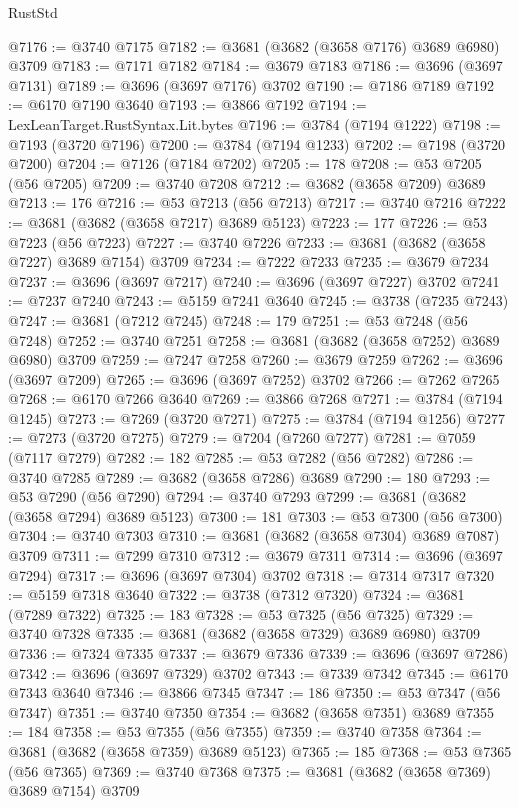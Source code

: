 \begin{lexlean}{RustStd}
\begin{coremodule}
@7176 := @3740 @7175
@7182 := @3681 (@3682 (@3658 @7176) @3689 @6980) @3709
@7183 := @7171 @7182
@7184 := @3679 @7183
@7186 := @3696 (@3697 @7131)
@7189 := @3696 (@3697 @7176) @3702
@7190 := @7186 @7189
@7192 := @6170 @7190 @3640
@7193 := @3866 @7192
@7194 := LexLeanTarget.RustSyntax.Lit.bytes
@7196 := @3784 (@7194 @1222)
@7198 := @7193 (@3720 @7196)
@7200 := @3784 (@7194 @1233)
@7202 := @7198 (@3720 @7200)
@7204 := @7126 (@7184 @7202)
@7205 := 178
@7208 := @53 @7205 (@56 @7205)
@7209 := @3740 @7208
@7212 := @3682 (@3658 @7209) @3689
@7213 := 176
@7216 := @53 @7213 (@56 @7213)
@7217 := @3740 @7216
@7222 := @3681 (@3682 (@3658 @7217) @3689 @5123)
@7223 := 177
@7226 := @53 @7223 (@56 @7223)
@7227 := @3740 @7226
@7233 := @3681 (@3682 (@3658 @7227) @3689 @7154) @3709
@7234 := @7222 @7233
@7235 := @3679 @7234
@7237 := @3696 (@3697 @7217)
@7240 := @3696 (@3697 @7227) @3702
@7241 := @7237 @7240
@7243 := @5159 @7241 @3640
@7245 := @3738 (@7235 @7243)
@7247 := @3681 (@7212 @7245)
@7248 := 179
@7251 := @53 @7248 (@56 @7248)
@7252 := @3740 @7251
@7258 := @3681 (@3682 (@3658 @7252) @3689 @6980) @3709
@7259 := @7247 @7258
@7260 := @3679 @7259
@7262 := @3696 (@3697 @7209)
@7265 := @3696 (@3697 @7252) @3702
@7266 := @7262 @7265
@7268 := @6170 @7266 @3640
@7269 := @3866 @7268
@7271 := @3784 (@7194 @1245)
@7273 := @7269 (@3720 @7271)
@7275 := @3784 (@7194 @1256)
@7277 := @7273 (@3720 @7275)
@7279 := @7204 (@7260 @7277)
@7281 := @7059 (@7117 @7279)
@7282 := 182
@7285 := @53 @7282 (@56 @7282)
@7286 := @3740 @7285
@7289 := @3682 (@3658 @7286) @3689
@7290 := 180
@7293 := @53 @7290 (@56 @7290)
@7294 := @3740 @7293
@7299 := @3681 (@3682 (@3658 @7294) @3689 @5123)
@7300 := 181
@7303 := @53 @7300 (@56 @7300)
@7304 := @3740 @7303
@7310 := @3681 (@3682 (@3658 @7304) @3689 @7087) @3709
@7311 := @7299 @7310
@7312 := @3679 @7311
@7314 := @3696 (@3697 @7294)
@7317 := @3696 (@3697 @7304) @3702
@7318 := @7314 @7317
@7320 := @5159 @7318 @3640
@7322 := @3738 (@7312 @7320)
@7324 := @3681 (@7289 @7322)
@7325 := 183
@7328 := @53 @7325 (@56 @7325)
@7329 := @3740 @7328
@7335 := @3681 (@3682 (@3658 @7329) @3689 @6980) @3709
@7336 := @7324 @7335
@7337 := @3679 @7336
@7339 := @3696 (@3697 @7286)
@7342 := @3696 (@3697 @7329) @3702
@7343 := @7339 @7342
@7345 := @6170 @7343 @3640
@7346 := @3866 @7345
@7347 := 186
@7350 := @53 @7347 (@56 @7347)
@7351 := @3740 @7350
@7354 := @3682 (@3658 @7351) @3689
@7355 := 184
@7358 := @53 @7355 (@56 @7355)
@7359 := @3740 @7358
@7364 := @3681 (@3682 (@3658 @7359) @3689 @5123)
@7365 := 185
@7368 := @53 @7365 (@56 @7365)
@7369 := @3740 @7368
@7375 := @3681 (@3682 (@3658 @7369) @3689 @7154) @3709

\end{coremodule}
\end{lexlean}
